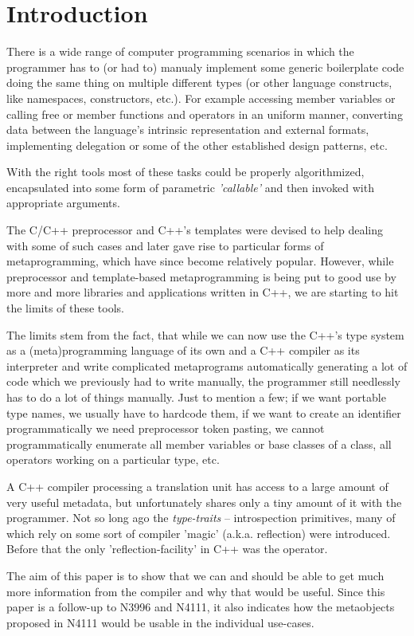 \section{Introduction}

There is a wide range of computer programming scenarios in which
the programmer has to (or had to) manualy implement some generic boilerplate
code doing the same thing on multiple different types (or other language constructs,
like namespaces, constructors, etc.). For example accessing member variables or
calling free or member functions and operators in an uniform
manner, converting data between the language's intrinsic representation and
external formats, implementing delegation or some of the other
established design patterns, etc.

With the right tools most of these tasks could be properly algorithmized,
encapsulated into some form of parametric {\em 'callable'} and then invoked
with appropriate arguments.

The C/C++ preprocessor and C++'s templates were devised to help dealing
with some of such cases and later gave rise to particular forms of metaprogramming,
which have since become relatively popular. However, while preprocessor and template-based
metaprogramming is being put to good use by more and more libraries and applications written
in C++, we are starting to hit the limits of these tools.

The limits stem from the fact, that while we can now use the C++'s type system
as a (meta)programming language of its own and a C++ compiler as its interpreter
and write complicated metaprograms automatically generating a lot of code
which we previously had to write manually, the programmer still needlessly has to do
a lot of things manually. Just to mention a few; if we want portable type names,
we usually have to hardcode them, if we want to create an identifier programmatically
we need preprocessor token pasting, we cannot programmatically enumerate all member
variables or base classes of a class, all operators working on a particular type, etc.

A C++ compiler processing a translation unit has access to a large amount
of very useful metadata, but unfortunately shares only a tiny amount of it
with the programmer. Not so long ago the {\em type-traits} -- introspection primitives,
many of which rely on some sort of compiler 'magic' (a.k.a. reflection) were introduced.
Before that the only 'reflection-facility' in C++ was the \verb@typeid@ operator.

The aim of this paper is to show that we can and should be able to get much more
information from the compiler and why that would be useful. Since this paper is a follow-up
to N3996 and N4111, it also indicates how the metaobjects proposed in N4111 would
be usable in the individual use-cases.


